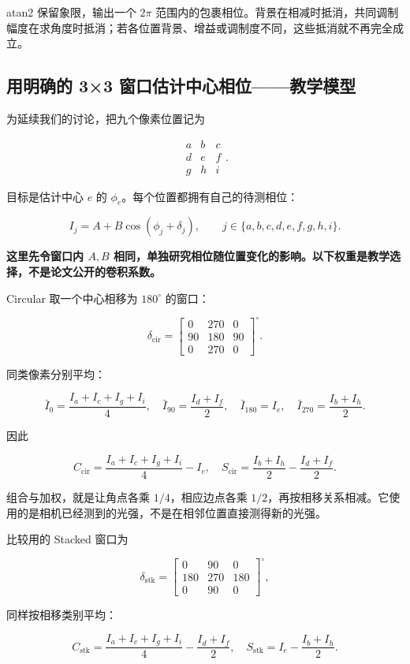 \documentclass[UTF8,fontset=fandol,11pt,a4paper]{ctexart}
\begin{document}
atan2 保留象限，输出一个 \(2\pi\) 范围内的包裹相位。背景在相减时抵消，共同调制幅度在求角度时抵消；若各位置背景、增益或调制度不同，这些抵消就不再完全成立。

\subsection{用明确的 3×3 窗口估计中心相位——教学模型}

为延续我们的讨论，把九个像素位置记为

\[
\begin{matrix}a&b&c\\d&e&f\\g&h&i\end{matrix}.
\]

目标是估计中心 \(e\) 的 \(\phi_e\)。每个位置都拥有自己的待测相位：

\[
I_j=A+B\cos(\phi_j+\delta_j),\qquad j\in\{a,b,c,d,e,f,g,h,i\}.
\]

\textbf{这里先令窗口内 \(A,B\) 相同，单独研究相位随位置变化的影响。以下权重是教学选择，不是论文公开的卷积系数。}

Circular 取一个中心相移为 \(180^\circ\) 的窗口：

\[
\delta_{\mathrm{cir}}=\begin{bmatrix}0&270&0\\90&180&90\\0&270&0\end{bmatrix}^{\circ}.
\]

同类像素分别平均：

\[
\bar I_0=\frac{I_a+I_c+I_g+I_i}{4},\quad
\bar I_{90}=\frac{I_d+I_f}{2},\quad
\bar I_{180}=I_e,\quad
\bar I_{270}=\frac{I_b+I_h}{2}.
\]

因此

\[
\boxed{C_{\mathrm{cir}}=\frac{I_a+I_c+I_g+I_i}{4}-I_e,\quad
S_{\mathrm{cir}}=\frac{I_b+I_h}{2}-\frac{I_d+I_f}{2}.}
\]

组合与加权，就是让角点各乘 \(1/4\)，相应边点各乘 \(1/2\)，再按相移关系相减。它使用的是相机已经测到的光强，不是在相邻位置直接测得新的光强。

比较用的 Stacked 窗口为

\[
\delta_{\mathrm{stk}}=\begin{bmatrix}0&90&0\\180&270&180\\0&90&0\end{bmatrix}^{\circ},
\]

同样按相移类别平均：

\[
\boxed{C_{\mathrm{stk}}=\frac{I_a+I_c+I_g+I_i}{4}-\frac{I_d+I_f}{2},\quad
S_{\mathrm{stk}}=I_e-\frac{I_b+I_h}{2}.}
\]
\end{document}

